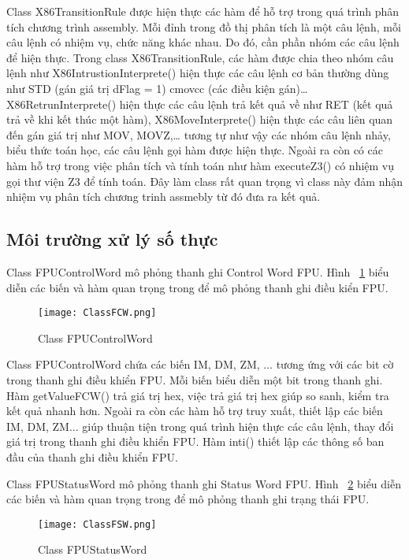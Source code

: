 	Class X86TransitionRule được hiện thực các hàm để hỗ trợ trong quá trình phân tích chương trình assembly. Mỗi đỉnh trong đồ thị phân tích là một câu lệnh, mỗi câu lệnh có nhiệm vụ, chức năng khác nhau. Do đó, cần phần nhóm các câu lệnh để hiện thực. Trong class X86TransitionRule, các hàm được chia theo nhóm câu lệnh như X86IntrustionInterprete() hiện thực các câu lệnh cơ bản thường dùng như STD (gán giá trị dFlag = 1) cmovcc (các điều kiện gán)… X86RetrunInterprete() hiện thực các câu lệnh trả kết quả về như RET (kết quả trả về khi kết thúc một hàm), X86MoveInterprete() hiện thực các câu liên quan đến gán giá trị như MOV, MOVZ,… tương tự như vậy các nhóm câu lệnh nhảy, biểu thức toán học, các câu lệnh gọi hàm được hiện thực. Ngoài ra còn có các hàm hỗ trợ trong việc phân tích và tính toán như hàm executeZ3() có nhiệm vụ gọi thư viện Z3 để tính toán. Đây làm class rất quan trọng vì class này đảm nhận nhiệm vụ phân tích chương trinh assmebly từ đó đưa ra kết quả.
	
	\newpage	
	\subsection*{Môi trường xử lý số thực}
	Class FPUControlWord mô phỏng thanh ghi Control Word FPU. Hình ~\ref{fig:FPUControlWord} biểu diễn các biến và hàm quan trọng trong để mô phỏng thanh ghi điều kiển FPU.	
		\begin{center}
			\begin{figure}[htp]
				\begin{center}
					\texttt{[image: ClassFCW.png]}
				\end{center}
				\caption{Class FPUControlWord	}	
					\label{fig:FPUControlWord}		
			\end{figure}
		\end{center}		
			
		Class FPUControlWord chứa các biến IM, DM, ZM, ... tương ứng với các bit cờ trong thanh ghi điều khiển FPU. Mỗi biến biểu diễn một bit trong thanh ghi. Hàm getValueFCW() trả giá trị hex, việc trả giá trị hex giúp so sanh, kiểm tra kết quả nhanh hơn. Ngoài ra còn các hàm hỗ trợ truy xuất, thiết lập các biến IM, DM, ZM... giúp thuận tiện trong quá trình hiện thực các câu lệnh, thay đổi giá trị trong thanh ghi điều khiển FPU. Hàm inti() thiết lập các thông số ban đầu của thanh ghi điều khiển FPU. 
		
		\newpage
		Class FPUStatusWord mô phỏng thanh ghi Status Word FPU. Hình ~\ref{fig:FPUStatusWord} biểu diễn các biến và hàm quan trọng trong để mô phỏng thanh ghi trạng thái FPU.	
	\begin{center}
			\begin{figure}[htp]
				\begin{center}
					\texttt{[image: ClassFSW.png]}
				\end{center}
				\caption{Class FPUStatusWord	}	
					\label{fig:FPUStatusWord}		
			\end{figure}
		\end{center}			
		
